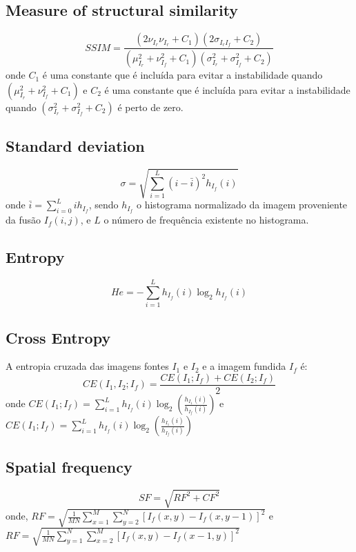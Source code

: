 \documentclass[conference]{IEEEtran}
\begin{document}
\subsection{Measure of structural similarity}
\begin{equation}
SSIM=\frac{(2\nu_{I_r}\nu_{I_r}+C_1)(2\sigma_{I_rI_f}+C_2)}{(\mu_{I_r}^2+\nu_{I_f}^2+C_1)(\sigma_{I_r}^2+\sigma_{I_f}^2+C_2)}
\end{equation}
onde $C_1$ é uma constante que é incluída para evitar a instabilidade quando $(\mu_{I_r}^2+\nu_{I_f}^2+C_1)$ e $C_2$ é uma constante que é incluída para evitar a instabilidade quando $(\sigma_{I_r}^2+\sigma_{I_f}^2+C_2)$ é perto de zero.
\subsection{Standard deviation}
\begin{equation}
\sigma=\sqrt{\sum_{i=1}^L(i-\bar{i})^2h_{I_f}(i)}
\end{equation}
onde $\bar{i}=\sum_{i=0}^Lih_{I_f}$, sendo $h_{I_f}$ o histograma normalizado da imagem proveniente da fusão $I_f(i,j)$, e $L$ o número de frequência existente no histograma.
\subsection{Entropy}
\begin{equation}
He=-\sum_{i=1}^Lh_{I_f}(i)\log_2 h_{I_f}(i)
\end{equation}
\subsection{Cross Entropy}
A entropia cruzada das imagens fontes $I_1$ e $I_2$ e a imagem fundida $I_f$ é:
\begin{equation}
CE(I_1,I_2;I_f)=\frac{CE(I_1;I_f)+CE(I_2;I_f)}{2}
\end{equation}
onde $CE(I_1;I_f)=\sum_{i=1}^Lh_{I_f}(i)\log_2\left( \frac{h_{I_1}(i)}{h_{I_f}(i)}\right)$ e $CE(I_1;I_f)=\sum_{i=1}^Lh_{I_f}(i)\log_2\left( \frac{h_{I_1}(i)}{h_{I_f}(i)}\right)$
\subsection{Spatial frequency}
\begin{equation}
SF=\sqrt{RF^2+CF^2}
\end{equation}
onde, $RF=\sqrt{\frac{1}{MN}\sum_{x=1}^M\sum_{y=2}^N[I_f(x,y)-I_f(x,y-1)]^2}$ e $RF=\sqrt{\frac{1}{MN}\sum_{y=1}^N\sum_{x=2}^M[I_f(x,y)-I_f(x-1,y)]^2}$
\end{document}
